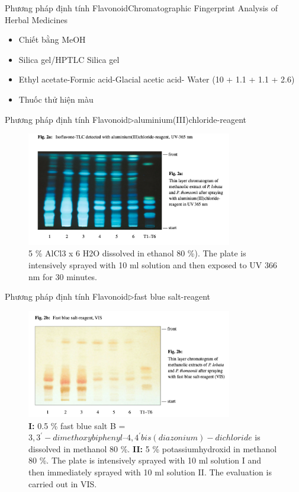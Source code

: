 \documentclass[11pt]{beamer}
\begin{document}
\begin{frame}{Phương pháp định tính Flavonoid}{Chromatographic Fingerprint Analysis of Herbal Medicines}
    \begin{itemize}
        \item Chiết bằng MeOH
        \item Silica gel/HPTLC Silica gel
        \item Ethyl acetate-Formic acid-Glacial acetic acid- Water (10 + 1.1 + 1.1 + 2.6)
        \item Thuốc thử hiện màu
    \end{itemize}
\end{frame}

\begin{frame}{Phương pháp định tính Flavonoid$\rhd$aluminium(III)chloride-reagent}
    \begin{figure}
        \centering
        \includegraphics[width=0.8\textwidth]{P. lobata and P. thomsonii.png}
		\caption{5 \% AlCl3 x 6 H2O dissolved in ethanol 80 \%). The plate is intensively sprayed with 10 ml solution and then exposed to UV 366 nm for 30 minutes.}
    \end{figure}
\end{frame}

\begin{frame}{Phương pháp định tính Flavonoid$\rhd$fast blue salt-reagent}
    \begin{figure}
        \centering
        \includegraphics[width=0.8\textwidth]{Fast blue salt-reagent.png}
        \caption{\tiny{
        {\bf I:} 0.5 \% fast blue salt B = $3,3^\prime-dimethoxybiphenyl–4,4^\prime bis (diazonium)-dichloride$ is dissolved in methanol 80 \%.
        {\bf II:} 5 \% potassiumhydroxid in methanol 80 \%.
        The plate is intensively sprayed with 10 ml solution I and then immediately sprayed with 10 ml solution II. The evaluation is carried out in VIS.}}
    \end{figure}
	
\end{frame}
\end{document}
